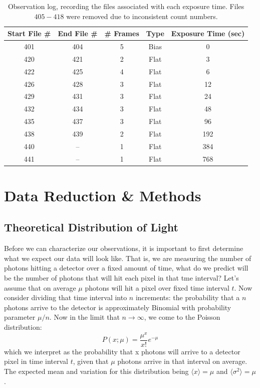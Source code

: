 \documentclass[preprint]{aastex62}
\begin{document}
\begin{table}[H]
\centering
\begin{tabular}{|c|c|c|c|c|}
    \hline
    Start File \# & End File \# & \# Frames & Type  & Exposure Time (sec) \\
    \hline
    \hline
    401 & 404 & 5 & Bias & 0  \\
    420 & 421 & 2 & Flat & 3 \\
    422 & 425 & 4 & Flat & 6 \\
    426 & 428 & 3 & Flat & 12 \\
    429 & 431 & 3 & Flat & 24 \\
    432 & 434 & 3 & Flat & 48 \\
    435 & 437 & 3 & Flat & 96 \\
    438 & 439 & 2 & Flat & 192 \\
    440 & --  & 1 & Flat & 384 \\
    441 & --  & 1 & Flat & 768 \\
    \hline
\end{tabular}
\caption{Observation log, recording the files associated with each exposure time. Files $405-418$ were removed due to inconsistent count numbers.} \label{table:log}
\end{table}


\section{Data Reduction \& Methods} \label{sec:methods}
\subsection{Theoretical Distribution of Light} \label{subsec:distributions}
Before we can characterize our observations, it is important to first determine what we expect our data will look like. That is, we are measuring the number of photons hitting a detector over a fixed amount of time, what do we predict will be the number of photons that will hit each pixel in that tme interval? Let's assume that on average $\mu$ photons will hit a pixel over fixed time interval $t$. Now consider dividing that time interval into $n$ increments: the probability that a $n$ photons arrive to the detector is approximately Binomial with probability parameter $\mu/n$. Now in the limit that $n\rightarrow\infty$, we come to the Poisson distribution:
\begin{equation}
P(x;\mu) = \frac{\mu^x}{x!}e^{-\mu}
\end{equation}
which we interpret as the probability that x photons will arrive to a detector pixel in time interval $t$, given that $\mu$ photons arrive in that interval on average. The expected mean and variation for this distribution being $\langle x \rangle = \mu$ and $\langle \sigma^2 \rangle = \mu$. 
\end{document}
